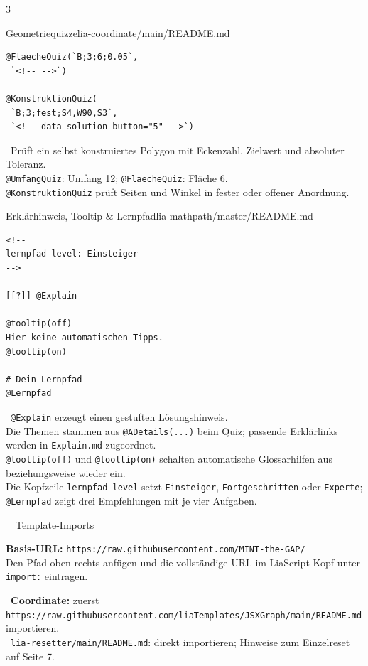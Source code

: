\documentclass[a4paper,landscape,9pt]{extarticle}
\newcommand{\prevsm}[1]{{\footnotesize\color{muted} #1}}
\begin{document}
\begin{multicols}{3}
\begin{schulcard}{Geometriequizze}{lia-coordinate/main/README.md}
\begin{lstlisting}[language=lia]
@FlaecheQuiz(`B;3;6;0.05`,
 `<!-- -->`)

@KonstruktionQuiz(
 `B;3;fest;S4,W90,S3`,
 `<!-- data-solution-button="5" -->`)
\end{lstlisting}
\tcblower
\prevsm{\faRulerCombined~Prüft ein selbst konstruiertes Polygon mit Eckenzahl, Zielwert und absoluter Toleranz.\\[2pt]
\texttt{@UmfangQuiz}: Umfang 12; \texttt{@FlaecheQuiz}: Fläche 6.\\[2pt]
\texttt{@KonstruktionQuiz} prüft Seiten und Winkel in fester oder offener Anordnung.}
\end{schulcard}

\begin{schulcard}{Erklärhinweis, Tooltip \& Lernpfad}{lia-mathpath/master/README.md}
\begin{lstlisting}[language=lia]
<!--
lernpfad-level: Einsteiger
-->

[[?]] @Explain

@tooltip(off)
Hier keine automatischen Tipps.
@tooltip(on)

# Dein Lernpfad
@Lernpfad
\end{lstlisting}
\tcblower
\prevsm{\faLightbulb~\texttt{@Explain} erzeugt einen gestuften Lösungshinweis.\\[2pt]
Die Themen stammen aus \texttt{@ADetails(...)} beim Quiz; passende Erklärlinks werden in \texttt{Explain.md} zugeordnet.\\[2pt]
\texttt{@tooltip(off)} und \texttt{@tooltip(on)} schalten automatische Glossarhilfen aus beziehungsweise wieder ein.\\[2pt]
Die Kopfzeile \texttt{lernpfad-level} setzt \texttt{Einsteiger}, \texttt{Fortgeschritten} oder \texttt{Experte}; \texttt{@Lernpfad} zeigt drei Empfehlungen mit je vier Aufgaben.}
\end{schulcard}

\end{multicols}
\endgroup

\noindent
\begin{schulinfo}{\faDownload~~Template-Imports}
\footnotesize
\begin{minipage}[t]{0.51\linewidth}
\textbf{Basis-URL:}  \texttt{https://raw.githubusercontent.com/MINT-the-GAP/} \\[1em]
Den Pfad oben rechts anfügen und die vollständige URL im LiaScript-Kopf unter \texttt{import:} eintragen.
\end{minipage}\hfill
\begin{minipage}[t]{0.48\linewidth}
\faInfoCircle~\textbf{Coordinate:} zuerst \texttt{https://raw.githubusercontent.com/liaTemplates/JSXGraph/main/README.md} importieren.\\[1pt]
\faUndo~\texttt{lia-resetter/main/README.md}: direkt importieren; Hinweise zum Einzelreset auf Seite 7.
\end{minipage}
\end{schulinfo}
\end{document}

